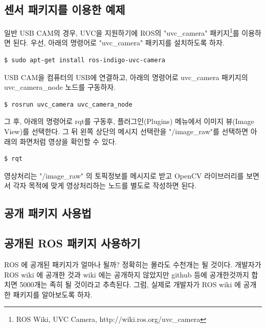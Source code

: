 \subsection{센서 패키지를 이용한 예제}

일반 USB CAM의 경우, UVC을 지원하기에 ROS의 "uvc\_camera" 패키지\footnote{ROS Wiki, UVC Camera, http://wiki.ros.org/uvc\_camera}를 이용하면 된다. 우선, 아래의 명령어로 "uvc\_camera" 패키지를 설치하도록 하자.

\begin{lstlisting}[language=ROS]
$ sudo apt-get install ros-indigo-uvc-camera 
\end{lstlisting}

\noindent
USB CAM을 컴퓨터의 USB에 연결하고, 아래의 명령어로 uvc\_camera 패키지의 uvc\_camera\_node 노드를 구동하자.

\begin{lstlisting}[language=ROS]
$ rosrun uvc_camera uvc_camera_node
\end{lstlisting}

그 후, 아래의 명령어로 rqt를 구동후, 플러그인(Plugins) 메뉴에서 이미지 뷰(Image View)를 선택한다. 그 뒤 왼쪽 상단의 메시지 선택란을 "/image\_raw"를 선택하면 아래의 화면처럼 영상을 확인할 수 있다. 

\begin{lstlisting}[language=ROS]
$ rqt
\end{lstlisting}

영상처리는 "/image\_raw" 의 토픽정보를 메시지로 받고 OpenCV 라이브러리를 보면서 각자 목적에 맞게 영상처리하는 노드를 별도로 작성하면 된다.

\subsection{공개 패키지 사용법}

\subsection{공개된 ROS 패키지 사용하기}

ROS 에 공개된 패키지가 얼마나 될까? 정확히는 몰라도 수천개는 될 것이다. 개발자가 ROS wiki 에 공개한 것과 wiki 에는 공개하지 않았지만 github 등에 공개한것까지 합치면 5000개는 족히 될 것이라고 추측된다. 그럼, 실제로 개발자가 ROS wiki 에 공개한 패키지를 알아보도록 하자.

